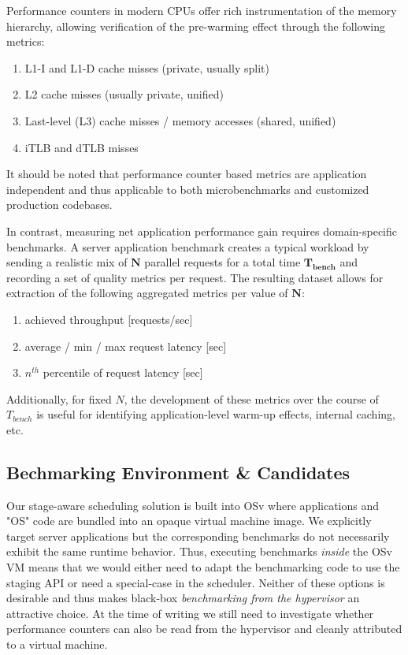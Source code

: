 \documentclass{article}
\begin{document}
Performance counters in modern CPUs offer rich instrumentation of the memory hierarchy,
allowing verification of the pre-warming effect through the following metrics:
\begin{enumerate}[label=\emph{(\alph*)}]
    \item L1-I and L1-D cache misses (private, usually split)
    \item L2 cache misses (usually private, unified)
    \item Last-level (L3) cache misses / memory accesses (shared, unified)
    \item iTLB and dTLB misses
\end{enumerate}
It should be noted that performance counter based metrics are application independent and thus applicable to both
microbenchmarks and customized production codebases.

In contrast, measuring net application performance gain requires domain-specific benchmarks.
A server application benchmark creates a typical workload by sending a realistic mix of $\mathbf{N}$ parallel requests
for a total time $\mathbf{T_{bench}}$ and recording a set of quality metrics per request.
The resulting dataset allows for extraction of the following aggregated metrics per value of $\mathbf{N}$:
\begin{enumerate}[label=\emph{(\alph*)}]
    \item achieved throughput [requests/sec]
    \item average / min / max request latency [sec]
    \item $n^{th}$ percentile of request latency [sec]
\end{enumerate}
Additionally, for fixed $N$, the development of these metrics over the course of $T_{bench}$ is useful for identifying
application-level warm-up effects, internal caching, etc.

\subsection{Bechmarking Environment \& Candidates}\label{environment}

Our stage-aware scheduling solution is built into OSv where applications and "OS" code are bundled into an opaque virtual
machine image.
We explicitly target server applications but the corresponding benchmarks do not necessarily exhibit the same runtime
behavior.
Thus, executing benchmarks \emph{inside} the OSv VM means that we would either need to adapt the benchmarking code to
use the staging API or need a special-case in the scheduler.
Neither of these options is desirable and thus makes black-box \emph{benchmarking from the hypervisor} an attractive choice.
At the time of writing we still need to investigate whether performance counters can also be read from the hypervisor
and cleanly attributed to a virtual machine.
\end{document}
